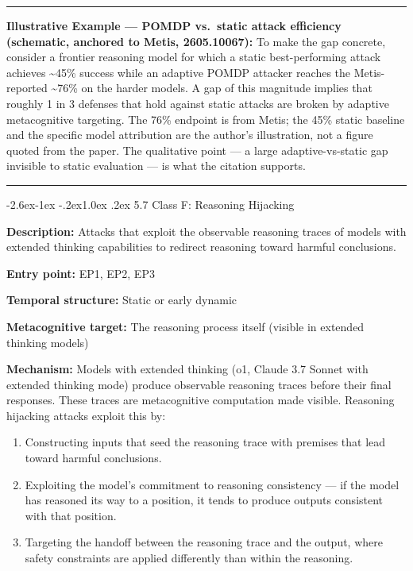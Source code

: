 \documentclass[
  11pt,
]{article}
\makeatletter
\providecommand{\tightlist}{%
  \setlength{\itemsep}{0pt}\setlength{\parskip}{0pt}}
\renewcommand\subsection{\@startsection{subsection}{2}{\z@}%
  {-2.6ex\@plus -1ex \@minus -.2ex}{1.0ex \@plus .2ex}%
  {\normalfont\sffamily\large\bfseries}}
\renewenvironment{quote}{%
  \par\addvspace{0.7em}%
  \noindent\rule{\linewidth}{1.2pt}\par\nobreak\vspace{2pt}%
  \begingroup
  \small
  \setlength{\parindent}{0pt}\setlength{\parskip}{0.3em}%
  \setlength{\leftskip}{0.9em}\setlength{\rightskip}{0.4em}%
  \ignorespaces
}{%
  \par\endgroup\vspace{2pt}%
  \noindent\rule{\linewidth}{0.4pt}\par\addvspace{0.7em}%
}
\makeatother
\begin{document}
\begin{quote}
\textbf{Illustrative Example --- POMDP vs.~static attack efficiency
(schematic, anchored to Metis, 2605.10067):} To make the gap concrete,
consider a frontier reasoning model for which a static best-performing
attack achieves \textasciitilde45\% success while an adaptive POMDP
attacker reaches the Metis-reported \textasciitilde76\% on the harder
models. A gap of this magnitude implies that roughly 1 in 3 defenses that
hold against static attacks are broken by adaptive metacognitive
targeting. The 76\% endpoint is from Metis; the 45\% static baseline and
the specific model attribution are the author's illustration, not a figure
quoted from the paper. The qualitative point --- a large adaptive-vs-static
gap invisible to static evaluation --- is what the citation supports.
\end{quote}

\subsection{5.7 Class F: Reasoning
Hijacking}\label{class-f-reasoning-hijacking}

\textbf{Description:} Attacks that exploit the observable reasoning
traces of models with extended thinking capabilities to redirect
reasoning toward harmful conclusions.

\textbf{Entry point:} EP1, EP2, EP3

\textbf{Temporal structure:} Static or early dynamic

\textbf{Metacognitive target:} The reasoning process itself (visible in
extended thinking models)

\textbf{Mechanism:} Models with extended thinking (o1, Claude 3.7 Sonnet
with extended thinking mode) produce observable reasoning traces before
their final responses. These traces are metacognitive computation made
visible. Reasoning hijacking attacks exploit this by:

\begin{enumerate}
\def\labelenumi{\arabic{enumi}.}
\tightlist
\item
  Constructing inputs that seed the reasoning trace with premises that
  lead toward harmful conclusions.
\item
  Exploiting the model's commitment to reasoning consistency --- if the
  model has reasoned its way to a position, it tends to produce outputs
  consistent with that position.
\item
  Targeting the handoff between the reasoning trace and the output,
  where safety constraints are applied differently than within the
  reasoning.
\end{enumerate}
\end{document}
